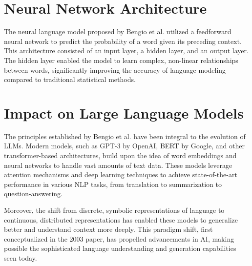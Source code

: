 \section*{Neural Network Architecture}

The neural language model proposed by Bengio et al. utilized a feedforward neural network to predict the probability of a word given its preceding context. This architecture consisted of an input layer, a hidden layer, and an output layer. The hidden layer enabled the model to learn complex, non-linear relationships between words, significantly improving the accuracy of language modeling compared to traditional statistical methods.

\section*{Impact on Large Language Models}

The principles established by Bengio et al. have been integral to the evolution of LLMs. Modern models, such as GPT-3 by OpenAI, BERT by Google, and other transformer-based architectures, build upon the idea of word embeddings and neural networks to handle vast amounts of text data. These models leverage attention mechanisms and deep learning techniques to achieve state-of-the-art performance in various NLP tasks, from translation to summarization to question-answering.

Moreover, the shift from discrete, symbolic representations of language to continuous, distributed representations has enabled these models to generalize better and understand context more deeply. This paradigm shift, first conceptualized in the 2003 paper, has propelled advancements in AI, making possible the sophisticated language understanding and generation capabilities seen today.






